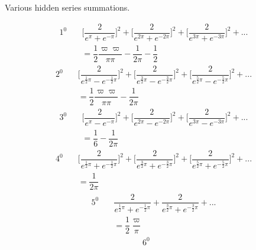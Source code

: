 \begingroup
\renewcommand{\arraystretch}{1.45}
\begin{center}Various hidden series summations.\end{center}
\[
\begin{aligned}1^{0}\quad&
\biggl[\dfrac{2}{e^\pi+e^{-\pi}}\biggr]^2
+\biggl[\dfrac{2}{e^{2\pi}+e^{-2\pi}}\biggr]^2
+\biggl[\dfrac{2}{e^{3\pi}+e^{-3\pi}}\biggr]^2+\mathord{.}\mathord{.}\mathord{.}
\\[8pt]&=\dfrac12\dfrac{\varpi\varpi}{\pi\pi}-\dfrac{1}{2\pi}-\dfrac12\end{aligned}
\]
\[
\begin{aligned}2^{0}\quad&
\biggl[\dfrac{2}{e^{\frac12\pi}-e^{-\frac12\pi}}\biggr]^2
+\biggl[\dfrac{2}{e^{\frac32\pi}-e^{-\frac32\pi}}\biggr]^2
+\biggl[\dfrac{2}{e^{\frac52\pi}-e^{-\frac52\pi}}\biggr]^2+\mathord{.}\mathord{.}\mathord{.}
\\[8pt]&=\dfrac12\dfrac{\varpi\varpi}{\pi\pi}-\dfrac{1}{2\pi}\end{aligned}
\]
\[
\begin{aligned}3^{0}\quad&
\biggl[\dfrac{2}{e^\pi-e^{-\pi}}\biggr]^2
+\biggl[\dfrac{2}{e^{2\pi}-e^{-2\pi}}\biggr]^2
+\biggl[\dfrac{2}{e^{3\pi}-e^{-3\pi}}\biggr]^2+\mathord{.}\mathord{.}\mathord{.}
\\[8pt]&=\dfrac16-\dfrac{1}{2\pi}\end{aligned}
\]
\[
\begin{aligned}4^{0}\quad&
\biggl[\dfrac{2}{e^{\frac12\pi}+e^{-\frac12\pi}}\biggr]^2
+\biggl[\dfrac{2}{e^{\frac32\pi}+e^{-\frac32\pi}}\biggr]^2
+\biggl[\dfrac{2}{e^{\frac52\pi}+e^{-\frac52\pi}}\biggr]^2+\mathord{.}\mathord{.}\mathord{.}
\\[8pt]&=\dfrac{1}{2\pi}\end{aligned}
\]
\[
\begin{aligned}5^{0}\quad&
\dfrac{2}{e^{\frac12\pi}+e^{-\frac12\pi}}
+\dfrac{2}{e^{\frac32\pi}+e^{-\frac32\pi}}+\mathord{.}\mathord{.}\mathord{.}
\\[8pt]&=\dfrac12\dfrac\varpi\pi\end{aligned}
\]
\nopagebreak[4]
\[
\begin{aligned}6^{0}\quad&\end{aligned}
\]



